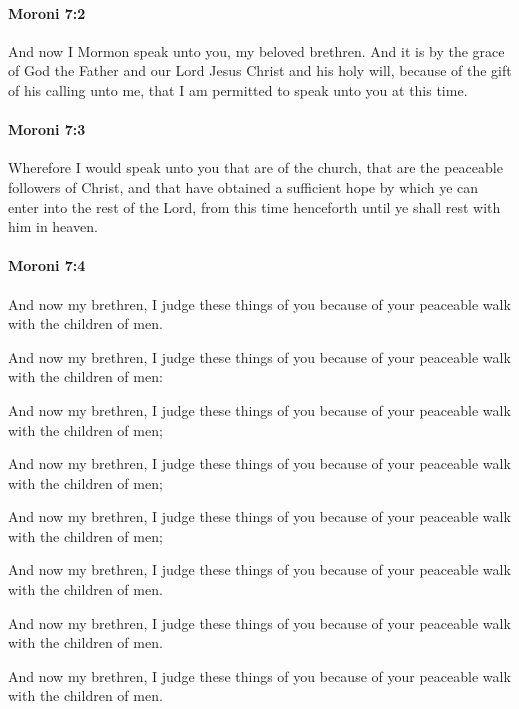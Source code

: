 		\paragraph{Moroni 7:2} %
			\label{MORONI-7-2}

			And now I Mormon speak unto you, my beloved brethren.
			And it is by the grace of God the Father and our Lord Jesus Christ
			and his holy will, because of the gift of his calling unto me,
			that I am permitted to speak unto you at this time.

		\paragraph{Moroni 7:3} %
			\label{MORONI-7-3}

			Wherefore I would speak unto you that are of the church,
			that are the peaceable followers of Christ,
			and that have obtained a sufficient hope
			by which ye can enter into the rest of the Lord,
			from this time henceforth until ye shall rest with him in heaven.

		\paragraph{Moroni 7:4} %
			\label{MORONI-7-4}

			And now my brethren, I judge these things of you
			because of your peaceable walk with the children of men.
			
			\begin{framed}
				\scriptsize
				\begin{compactdesc}
					\item[OM] [\textit{missing}]
					\item[PM] 
					\item[1830] And now my brethren, I judge these things of you because of your peaceable walk with the children of men:
					\item[1837] And now my brethren, I judge these things of you because of your peaceable walk with the children of men;
					\item[1840] And now my brethren, I judge these things of you because of your peaceable walk with the children of men;
					\item[1879] And now my brethren, I judge these things of you because of your peaceable walk with the children of men;
					\item[1920] And now my brethren, I judge these things of you because of your peaceable walk with the children of men.
					\item[1981] And now my brethren, I judge these things of you because of your peaceable walk with the children of men.
					\item[ABM] And now my brethren, I judge these things of you because of your peaceable walk with the children of men.
				\end{compactdesc}
			\end{framed}

